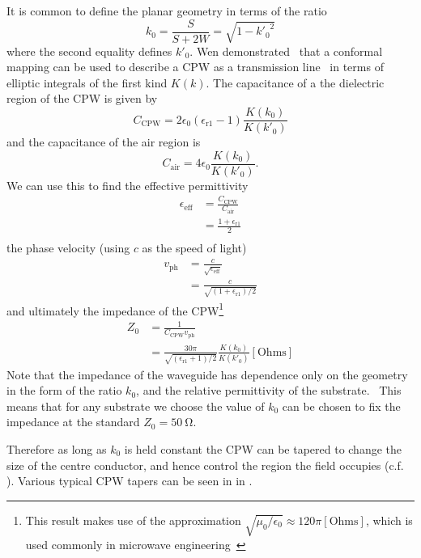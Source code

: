 It is common to define the planar geometry in terms of the
ratio~\cite{1127105, Simons2004}
\begin{equation}
  k_0 = \frac{S}{S+2W} = \sqrt{1-{k'_0}^2}
  \label{eqn:k0def}
\end{equation}
where the second equality defines $k'_0$.
%
Wen demonstrated~\cite{1127105} that a conformal mapping can be used to describe
a CPW as a transmission line~\cite{Jackson1975} in terms of elliptic integrals
of the first kind $K(k)$. The capacitance of a the dielectric region of the CPW
is given by
\begin{equation}
  C_\mathrm{CPW} = 2\epsilon_0(\epsilon_\mathrm{r1}-1)\frac{K(k_0)}{K(k'_0)}
\end{equation}
and the capacitance of the air region is
\begin{equation}
  C_\mathrm{air} = 4\epsilon_0 \frac{K(k_0)}{K(k'_0)}.
\end{equation}
We can use this to find the effective permittivity 
\begin{align}
  \epsilon_\mathrm{eff} &= \frac{C_\mathrm{CPW}}{C_\mathrm{air}} \\
    &= \frac{1+ \epsilon_\mathrm{r1}}{2} \\
\end{align}
the phase velocity (using $c$ as the speed of light)
\begin{align}
  v_\mathrm{ph} &= \frac{c}{\sqrt{\epsilon_\mathrm{eff}}} \\
    &= \frac{c}{\sqrt{(1 + \epsilon_\mathrm{r1})/2}}
\end{align}
and ultimately the impedance of the CPW\footnote{This result makes use of the
approximation $\sqrt{\mu_0/\epsilon_0}\approx120\pi\mathrm{[Ohms]}$, which is
used commonly in microwave engineering~\cite{Collin2007}}
\begin{align}
  Z_0 &= \frac{1}{C_\mathrm{CPW} v_\mathrm{ph}} \\
    &= \frac{30 \pi}{\sqrt{(\epsilon_\mathrm{r1}+1)/2}} \frac{K(k_0)}{K(k'_0)}
    \mathrm{[Ohms]}
\end{align}
Note that the impedance of the waveguide has dependence only on the geometry in
the form of the ratio $k_0$, and the relative permittivity of the
substrate.~\cite{Simons2004} This means that for any substrate we choose the
value of $k_0$ can be chosen to fix the impedance at the standard $Z_0 =
\SI{50}{\ohm}$.

Therefore as long as $k_0$ is held constant the CPW can be tapered to change the
size of the centre conductor, and hence control the region the field occupies
(c.f. ).  Various typical CPW tapers  can be
seen in in .~\cite{Simons2004}

